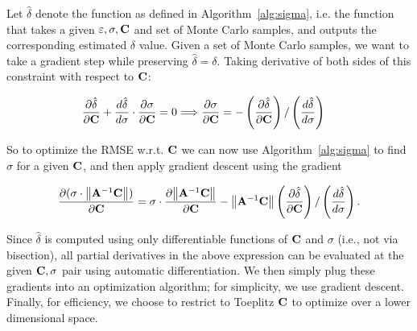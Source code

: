 Let $\hat{\delta}$ denote the function as defined in Algorithm~\ref{alg:sigma}, i.e. the function that takes a given $\varepsilon, \sigma, \mathbf{C}$ and set of Monte Carlo samples, and outputs the corresponding estimated $\delta$ value. Given a set of Monte Carlo samples, we want to take a gradient step while preserving $\hat{\delta} = \delta$. Taking derivative of both sides of this constraint with respect to $\mathbf{C}$:

\begin{align*}
\frac{\partial \hat{\delta}}{\partial \mathbf{C}} + \frac{d \hat{\delta}}{d\sigma} \cdot \frac{\partial \sigma}{\partial \mathbf{C}} &= 0
\Longrightarrow \frac{\partial \sigma}{\partial \mathbf{C}} = - \left(\frac{\partial \hat{\delta}}{\partial \mathbf{C}}\right) / \left(\frac{d \hat{\delta}}{d\sigma} \right)
\end{align*}

So to optimize the RMSE w.r.t. $\mathbf{C}$ we can now use Algorithm~\ref{alg:sigma} to find $\sigma$ for a given $\mathbf{C}$, and then apply gradient descent using the gradient

\[\frac{\partial (\sigma \cdot {\left\Vert {\ensuremath{\mathbf{A}}^{-1}\ensuremath{\mathbf{C}}} \right\Vert})}{\partial \mathbf{C}} =  \sigma \cdot \frac{\partial {\left\Vert {\ensuremath{\mathbf{A}}^{-1}\ensuremath{\mathbf{C}}} \right\Vert}}{\partial \mathbf{C}} - {\left\Vert {\ensuremath{\mathbf{A}}^{-1}\ensuremath{\mathbf{C}}} \right\Vert}\left(\frac{\partial \hat{\delta}}{\partial \mathbf{C}}\right) / \left(\frac{d \hat{\delta}}{d\sigma} \right).\]

Since $\hat{\delta}$ is computed using only differentiable functions of $\mathbf{C}$ and $\sigma$ (i.e., not via bisection), all partial derivatives in the above expression can be evaluated at the given $\mathbf{C}, \sigma$ pair using automatic differentiation. We then simply plug these gradients into an optimization algorithm; for simplicity, we use gradient descent. Finally, for efficiency, we choose to restrict to Toeplitz $\mathbf{C}$ to optimize over a lower dimensional space.